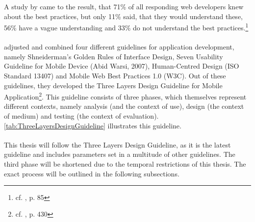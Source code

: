 \\
\\
A study by \cite{Dahanayake.2010} came to the result, that 71\% of all responding web developers knew about the best practices, but only 11\% said, that they would understand these, 56\% have a vague understanding and 33\% do not understand the best practices.\footnote{cf. \cite{Dahanayake.2010}, p. 85}
\\
\\
\cite{AyobNurulZakiahbinti.2009} adjusted and combined four different guidelines for application development, namely Shneiderman’s Golden Rules of Interface Design, Seven Usability Guideline for Mobile Device (Abid Warsi, 2007), Human-Centred Design (ISO Standard 13407) and Mobile Web Best Practices 1.0 (W3C). Out of these guidelines, they developed the Three Layers Design Guideline for Mobile Application\footnote{cf. \cite{AyobNurulZakiahbinti.2009}, p. 430}. This guideline consists of three phases, which themselves represent different contexts, namely analysis (and the context of use), design (the context of medium) and testing (the context of evaluation). \ref{tab:ThreeLayersDesignGuideline} illustrates this guideline.
\\
\\
This thesis will follow the Three Layers Design Guideline, as it is the latest guideline and includes parameters set in a multitude of other guidelines. The third phase will be shortened due to the temporal restrictions of this thesis. The exact process will be outlined in the following subsections.

